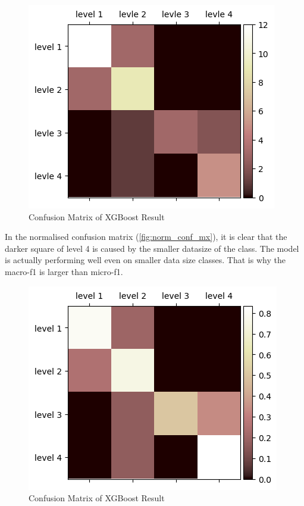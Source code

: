 \documentclass[10pt, a4paper, twocolumn]{article} %
\begin{document}
\begin{figure}
	\includegraphics[width=\linewidth]{fig/conf_mx.png} 
	\caption{Confusion Matrix of XGBoost Result} 
	\label{fig:conf_mx} 
\end{figure}

In the normalised confusion matrix (\autoref{fig:norm_conf_mx}), it is clear that the darker square of level 4 is caused by the smaller 
datasize of the class. The model is actually performing well even on smaller data size classes. That is why 
the macro-f1 is larger than micro-f1.\\[5pt]
\begin{figure}
	\includegraphics[width=\linewidth]{fig/norm_conf_mx.png} 
	\caption{Confusion Matrix of XGBoost Result} 
	\label{fig:norm_conf_mx} 
\end{figure}
\end{document}
